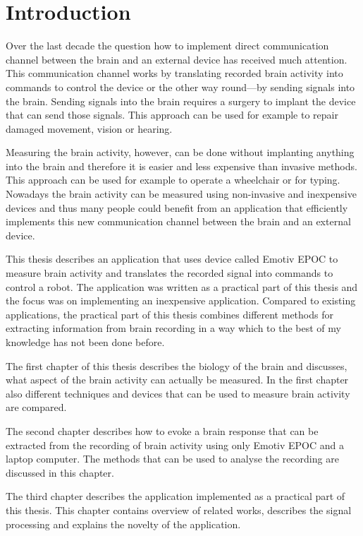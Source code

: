 
\chapter*{Introduction}

Over the last decade the question how to implement direct communication channel between the brain and an external device has received much attention. This communication channel works by translating recorded brain activity into commands to control the device or the other way round---by sending signals into the brain. Sending signals into the brain requires a surgery to implant the device that can send those signals. This approach can be used for example to repair damaged movement, vision or hearing.

Measuring the brain activity, however, can be done without implanting anything into the brain and therefore it is easier and less expensive than invasive methods. This approach can be used for example to operate a wheelchair or for typing. Nowadays the brain activity can be measured using non-invasive and inexpensive devices and thus many people could benefit from an application that efficiently implements this new communication channel between the brain and an external device.

This thesis describes an application that uses device called Emotiv EPOC to measure brain activity and translates the recorded signal into commands to control a robot. The application was written as a practical part of this thesis and the focus was on implementing an inexpensive application. Compared to existing applications, the practical part of this thesis combines different methods for extracting information from brain recording in a way which to the best of my knowledge has not been done before.

The first chapter of this thesis describes the biology of the brain and discusses, what aspect of the brain activity can actually be measured. In the first chapter also different techniques and devices that can be used to measure brain activity are compared.

The second chapter describes how to evoke a brain response that can be extracted from the recording of brain activity using only Emotiv EPOC and a laptop computer. The methods that can be used to analyse the recording are discussed in this chapter.

The third chapter describes the application implemented as a practical part of this thesis. This chapter contains overview of related works, describes the signal processing and explains the novelty of the application.
